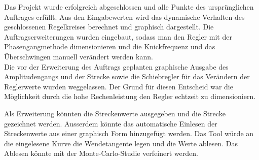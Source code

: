 Das   Projekt   wurde   erfolgreich   abgeschlossen  und   alle   Punkte   des
urspr\"unglichen   Auftrages  erf\"ullt. Aus   den   Eingabewerten  wird   das
dynamische Verhalten  des geschlossenen  Regelkreises berechnet  und graphisch
dargestellt. Die Auftragserweiterungen wurden eingebaut, sodass man den Regler
mit  der  Phasengangmethode  dimensionieren  und  die  Knickfrequenz  und  das
\"Uberschwingen  manuell ver\"andert  werden kann. \\Die  vor der  Erweiterung
des  Auftrags  geplanten  graphische   Ausgabe  des  Amplitudengangs  und  der
Strecke sowie  die Schiebregler f\"ur  das Ver\"andern der  Reglerwerte wurden
weggelassen. Der Grund f\"ur diesen Entscheid  war die M\"oglichkeit durch die
hohe Rechenleistung den Regler echtzeit zu dimensioniern.

Als  Erweiterung  k\"onnten  die  Streckenwerte  ausgegeben  und  die  Strecke
gezeichnet   werden. Ausserdem   k\"onnte   das  automatische   Einlesen   der
Streckenwerte aus einer graphisch  Form hinzugef\"ugt werden. Das Tool w\"urde
an die  eingelesene Kurve die  Wendetangente legen und die  Werte ablesen. Das
Ablesen k\"onnte mit der Monte-Carlo-Studie verfeinert werden.
